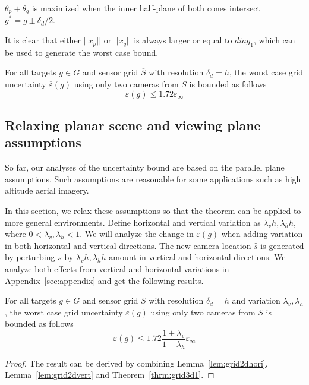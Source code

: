 \begin{lemma}\label{lem:grid2d2}
$\theta_p + \theta_q$ is maximized when the inner half-plane of both cones intersect $g^* = g \pm  \delta_d/2$. 
\end{lemma}



It is clear that either $||x_p||$ or $||x_q||$ is always larger or equal to $diag_1$, which can be used to generate the worst case bound.
\begin{theorem}\label{thrm:grid3d1}
For all targets $g \in G$ and sensor grid $\overline{S}$ with resolution $\delta_d = h$, the worst case grid uncertainty $\overline{\varepsilon}(g)$ using only two cameras from $\overline{S}$ is bounded as follows
$$
\overline{\varepsilon}(g) \leqslant 1.72 \varepsilon_\infty
$$
\end{theorem}



\subsection{Relaxing planar scene and viewing plane assumptions}
So far, our analyses of the uncertainty bound are based on the parallel plane assumptions. Such assumptions are reasonable for some applications such as high altitude aerial imagery. 

In this section, we relax these assumptions so that the theorem can be applied to more general environments. Define horizontal and vertical variation as $\lambda_vh, \lambda_hh$, where $0 < \lambda_v, \lambda_h < 1$.
We will analyze the change in $\overline{\varepsilon}(g)$ when adding variation in both horizontal and vertical directions.
The new camera location $\hat{s}$ is generated by perturbing $s$  by $\lambda_vh,\lambda_hh$ amount in vertical and horizontal directions.
We analyze both effects from vertical and horizontal variations in Appendix~\ref{sec:appendix} and get the following results. 

\begin{theorem}\label{thrm:gridU2d}
For all targets $g \in G$ and sensor grid $\overline{S}$ with resolution $\delta_d = h$ and variation $\lambda_v,\lambda_h$, the worst case grid uncertainty $\overline{\varepsilon}(g)$ using only two cameras from $\overline{S}$ is bounded as follows
$$
\overline{\varepsilon}(g) \leqslant 1.72\frac{1+\lambda_v}{1-\lambda_h} \varepsilon_\infty
$$
\end{theorem}
\begin{proof}
The result can be derived by combining Lemma~\ref{lem:grid2dhori}, Lemma~\ref{lem:grid2dvert} and Theorem~\ref{thrm:grid3d1}.
\end{proof}


